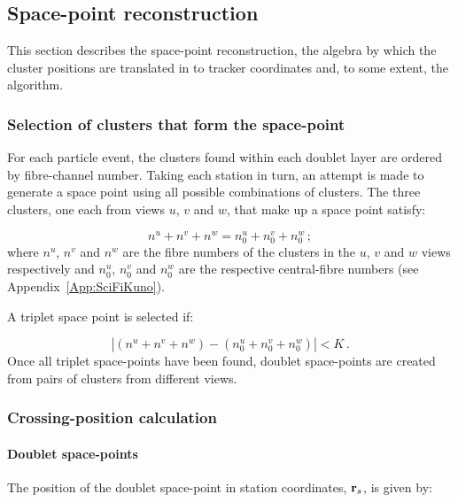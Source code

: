 \subsection{Space-point reconstruction}
\label{Sect:SciFiSpcPnt}

This section describes the space-point reconstruction, the algebra by which the cluster positions are translated in to tracker coordinates and, to some extent, the algorithm.

\subsubsection{Selection of clusters that form the space-point}

For each particle event, the clusters found within each doublet layer are ordered by fibre-channel number. Taking each station in turn, an attempt is made to generate a space point using all possible combinations of clusters. The three clusters, one each from views $u$, $v$ and $w$, that make up a space point satisfy:

\begin{equation}
 n^u + n^v + n^w = n^u_0 + n^v_0 + n^w_0 \, ;
\end{equation}
where $n^u$, $n^v$ and $n^w$ are the fibre numbers of the clusters in the $u$, $v$ and $w$ views respectively and $n^u_0$, $n^v_0$ and $n^w_0$ are the respective central-fibre numbers (see Appendix~\ref{App:SciFiKuno}).

A triplet space point is selected if:

\begin{equation}
  | (n^u + n^v + n^w) - (n^u_0 + n^v_0 + n^w_0) | < K \, .
\end{equation}
Once all triplet space-points have been found, doublet space-points are created from pairs of clusters from different views.

\subsubsection{Crossing-position calculation}

\paragraph{Doublet space-points}
\label{Para:DoubletSpacepoint}

The position of the doublet space-point in station coordinates, ${\bf r}_s$, is given by:

